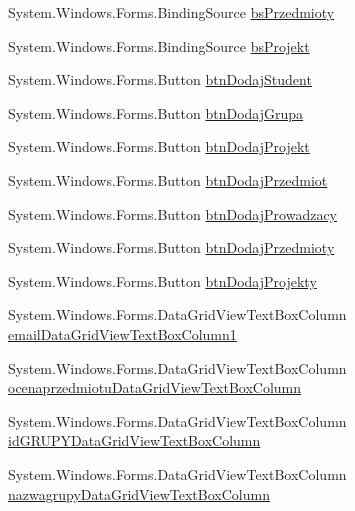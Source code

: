 \begin{DoxyCompactItemize}
\item 
System.\+Windows.\+Forms.\+Binding\+Source \hyperlink{class_dziennik_ocen_1_1_form_admin_a5de64a16e387981ee49506b801945ddd}{bs\+Przedmioty}
\item 
System.\+Windows.\+Forms.\+Binding\+Source \hyperlink{class_dziennik_ocen_1_1_form_admin_a262a31373e35cec908134bb01d7bd135}{bs\+Projekt}
\item 
System.\+Windows.\+Forms.\+Button \hyperlink{class_dziennik_ocen_1_1_form_admin_a2c9c13e11214db9b7bd7d38e5b0d702c}{btn\+Dodaj\+Student}
\item 
System.\+Windows.\+Forms.\+Button \hyperlink{class_dziennik_ocen_1_1_form_admin_ab81e4a1037f33b0ac3125dcf9b589719}{btn\+Dodaj\+Grupa}
\item 
System.\+Windows.\+Forms.\+Button \hyperlink{class_dziennik_ocen_1_1_form_admin_a9e9f56e615db94726ec5f84c955c0a77}{btn\+Dodaj\+Projekt}
\item 
System.\+Windows.\+Forms.\+Button \hyperlink{class_dziennik_ocen_1_1_form_admin_a9d0807ac61806a6c11d6d8d803fae334}{btn\+Dodaj\+Przedmiot}
\item 
System.\+Windows.\+Forms.\+Button \hyperlink{class_dziennik_ocen_1_1_form_admin_a78c6935670aa636d9fa2db119065a924}{btn\+Dodaj\+Prowadzacy}
\item 
System.\+Windows.\+Forms.\+Button \hyperlink{class_dziennik_ocen_1_1_form_admin_ad5380dd7001fab173e85b01893731451}{btn\+Dodaj\+Przedmioty}
\item 
System.\+Windows.\+Forms.\+Button \hyperlink{class_dziennik_ocen_1_1_form_admin_a04cc551c6f19adc7cc95f84ce7b3c390}{btn\+Dodaj\+Projekty}
\item 
System.\+Windows.\+Forms.\+Data\+Grid\+View\+Text\+Box\+Column \hyperlink{class_dziennik_ocen_1_1_form_admin_a9a5627214167e623fdaf816913955845}{email\+Data\+Grid\+View\+Text\+Box\+Column1}
\item 
System.\+Windows.\+Forms.\+Data\+Grid\+View\+Text\+Box\+Column \hyperlink{class_dziennik_ocen_1_1_form_admin_a282e652aef3c33335c0ad609a65b0006}{ocenaprzedmiotu\+Data\+Grid\+View\+Text\+Box\+Column}
\item 
System.\+Windows.\+Forms.\+Data\+Grid\+View\+Text\+Box\+Column \hyperlink{class_dziennik_ocen_1_1_form_admin_a95f6cc81f2184385fc78c287488d630d}{id\+G\+R\+U\+P\+Y\+Data\+Grid\+View\+Text\+Box\+Column}
\item 
System.\+Windows.\+Forms.\+Data\+Grid\+View\+Text\+Box\+Column \hyperlink{class_dziennik_ocen_1_1_form_admin_abc8ecccfd2a3b07c6a5e51a89f4916c4}{nazwagrupy\+Data\+Grid\+View\+Text\+Box\+Column}

\end{DoxyCompactItemize}
